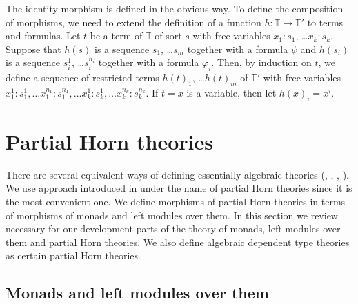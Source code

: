 The identity morphism is defined in the obvious way.
To define the composition of morphisms, we need to extend the definition of a function $h : \mathbb{T} \to \mathbb{T}'$ to terms and formulas.
Let $t$ be a term of $\mathbb{T}$ of sort $s$ with free variables $x_1 : s_1$, \ldots $x_k : s_k$.
Suppose that $h(s)$ is a sequence $s_1$, \ldots $s_m$ together with a formula $\psi$
and $h(s_i)$ is a sequence $s^1_i$, \ldots $s^{n_i}_i$ together with a formula $\varphi_i$.
Then, by induction on $t$, we define a sequence of restricted terms $h(t)_1$, \ldots $h(t)_m$ of $\mathbb{T}'$
with free variables $x^1_1 : s^1_1, \ldots x^{n_1}_1 : s^{n_1}_1, \ldots x^1_k : s^1_k, \ldots x^{n_k}_k : s^{n_k}_k$.
If $t = x$ is a variable, then let $h(x)_i = x^i$.


\section{Partial Horn theories}
\label{sec:PHT}

There are several equivalent ways of defining essentially algebraic theories (\cite{LPC}, \cite{GAT}, \cite{PHL}, \cite[D 1.3.4]{elephant}).
We use approach introduced in \cite{PHL} under the name of partial Horn theories since it is the most convenient one.
We define morphisms of partial Horn theories in terms of morphisms of monads and left modules over them.
In this section we review necessary for our development parts of the theory of monads, left modules over them and partial Horn theories.
We also define algebraic dependent type theories as certain partial Horn theories.

\subsection{Monads and left modules over them}


